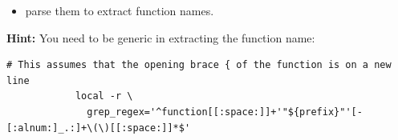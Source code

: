 \begin{frame}
\begin{onlyenv}
\begin{enumerate}
\begin{itemize}
                      \item parse them to extract function names.
                  \end{itemize}
        \textbf{Hint:} You need to be generic in extracting the function name:
        \begin{lstlisting}[style=MyBash, numbers=none, aboveskip=3mm, belowskip=-5mm,
                           style=smaller, emph={[2]{grep_regex}}, xleftmargin=2mm, xrightmargin=5mm]
            # This assumes that the opening brace { of the function is on a new line
            local -r \
              grep_regex='^function[[:space:]]+'"${prefix}"'[-[:alnum:]_.:]+\(\)[[:space:]]*$'
        \end{lstlisting}
        \end{enumerate}
    \end{onlyenv}
\end{frame}

